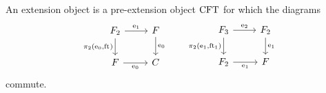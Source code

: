 \begin{defn} An extension object is a pre-extension object $\mathrm{CFT}$ for which 
the diagrams
\begin{equation*}
\begin{tikzcd}
\stesysf_2 
  \ar{d}[swap]{\pullbackpr{2}{\ectxext}{\eft}} 
  \ar{r}{\efamext} 
  & 
\stesysf 
  \ar{d}{\ectxext}
  \\
\stesysf 
  \ar{r}[swap]{\ectxext} 
  & 
\stesysc
\end{tikzcd}
\qquad
\begin{tikzcd}
\stesysf_3
  \ar{d}[swap]{\pullbackpr{2}{\efamext}{\eft[1]}}
  \ar{r}{\eext{2}}
  & 
\stesysf_2 
  \ar{d}{\efamext} 
  \\
\stesysf_2 
  \ar{r}[swap]{\efamext} 
  &
\stesysf
\end{tikzcd}
\end{equation*}
commute.
\end{defn}

\begin{comment}
\begin{lem}
There exists an isomorphism $\alpha$ such that the triangle
\begin{equation*}
\begin{tikzcd}[column sep=tiny]
\pullback{\stesysf}{\stesysf_2}{\ectxext}{\eft\circ\eft[1]}
  \ar[dotted]{rr}{\alpha}
  \ar{dr}[swap]{\pullback{\catid{\stesysf}}{\efamext}{\ectxext}{\eft}}
  &
  &
\stesysf_3
  \ar{dl}{\eext{2}}
  \\
& \stesysf_2
\end{tikzcd}
\end{equation*}
commutes
\end{lem}

\begin{proof}
There is a unique morphism $\alpha:
\pullback{\stesysf}{\stesysf_2}{\ectxext}{\eft\circ\eft[1]}\to\stesysf_3$
rendering the diagram
\begin{equation*}
\begin{tikzcd}[column sep=large]
\pullback{\stesysf}{\stesysf_2}{\ectxext}{\eft\circ\eft[1]}
  \ar[bend left=10,yshift=.5ex]{drrr}{\pullbackpr{2}{\ectxext}{\eft}\circ\pullbackpr{2}{\ectxext}{\eft\circ\eft[1]}}
  \ar[bend right=10]{ddr}[swap]{\pullback{\catid{\stesysf}}{\eft[1]}{\ectxext}{\eft}}
  \ar[dotted]{dr}{\alpha}
  \\
& \stesysf_3
  \ar{r}{\pullbackpr{2}{\efamext}{\eft[1]}}
  \ar{d}{\eft[2]}
  &
\stesysf_2
  \ar{d}[swap]{\eft[1]}
  \ar{r}[swap]{\pullbackpr{2}{\ectxext}{\eft}}
  &
\stesysf
  \ar{d}{\eft}
  \\
{} & \stesysf_2
  \ar{r}[swap]{\efamext}
  &
\stesysf
  \ar{r}[swap]{\ectxext}
  &
\stesysc
\end{tikzcd}
\end{equation*}
\end{proof}
\end{comment}

